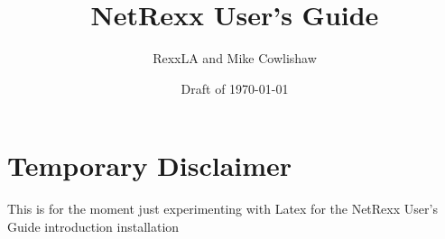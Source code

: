 \documentclass[12pt]{book}
\begin{document}
        
\setcounter{tocdepth}{1} 
\title{NetRexx User's Guide}
\author{RexxLA and Mike Cowlishaw}
\date{Draft of \today}
\maketitle
{}
\pagestyle{plain}
\frontmatter
{}
\pagestyle{plain}
\large
\section*{Temporary Disclaimer}
This is for the moment just experimenting with Latex for the NetRexx
User's Guide
\newpage
\large
\tableofcontents
\newpage
{}
\large
\frontmatter
 {introduction}
\mainmatter
 {installation}



\backmatter
\listoffigures
\listoftables
\printindex
\end{document}
